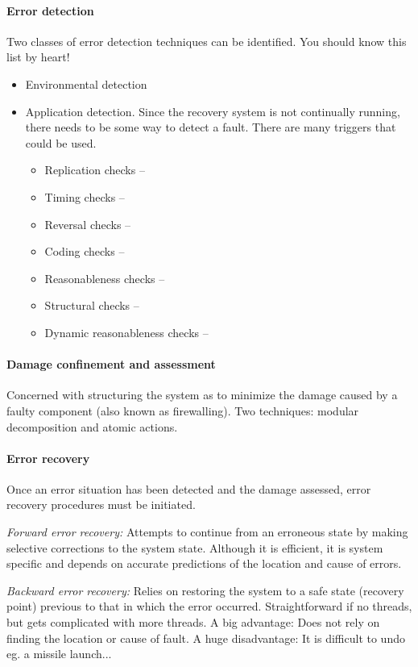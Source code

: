 \paragraph{Error detection} Two classes of error detection techniques can be identified. You should know this list by heart!
\begin{itemize}[nolistsep,noitemsep]
  \item Environmental detection
  \item Application detection. Since the recovery system is not continually running, there needs to be some way to detect a fault. There are many triggers that could be used.
  \begin{itemize}[nolistsep,noitemsep]
    \item Replication checks --
    \item Timing checks --
    \item Reversal checks --
    \item Coding checks --
    \item Reasonableness checks --
    \item Structural checks --
    \item Dynamic reasonableness checks --
  \end{itemize}
\end{itemize}

\paragraph{Damage confinement and assessment} Concerned with structuring the system as to minimize the damage caused by a faulty component (also known as firewalling). Two techniques: modular decomposition and atomic actions.

\paragraph{Error recovery} Once an error situation has been detected and the damage assessed, error recovery procedures must be initiated.

\textit{Forward error recovery:} Attempts to continue from an erroneous state by making selective corrections to the system state. Although it is efficient, it is system specific and depends on accurate predictions of the location and cause of errors.

\textit{Backward error recovery:} Relies on restoring the system to a safe state (recovery point) previous to that in which the error occurred. Straightforward if no threads, but gets complicated with more threads. A big advantage: Does not rely on finding the location or cause of fault. A huge disadvantage: It is difficult to undo eg. a missile launch...

